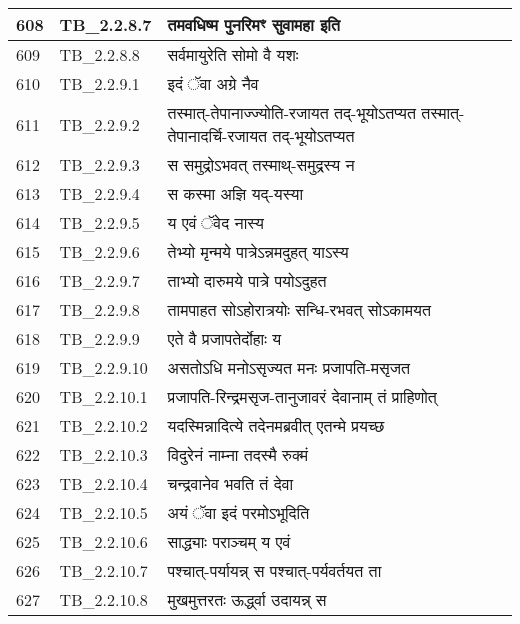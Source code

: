 \documentclass[17pt]{extarticle}
\begin{document}
\begin{longtable}{||p{0.4in}||p{0.9in}||p{4.0in}||p{0.9in}||}
        \hline
            608 & TB\_2.2.8.7 & तमवधिष्म पुनरिमꣳ सुवामहा इति &      \\
        \hline
            609 & TB\_2.2.8.8 & सर्वमायुरेति सोमो वै यशः &      \\
        \hline
            610 & TB\_2.2.9.1 & इदं ॅवा अग्रे नैव &      \\
        \hline
            611 & TB\_2.2.9.2 & तस्मात्{-}तेपानाज्ज्योति{-}रजायत तद्{-}भूयोऽतप्यत तस्मात्{-}तेपानादर्चि{-}रजायत तद्{-}भूयोऽतप्यत &      \\
        \hline
            612 & TB\_2.2.9.3 & स समुद्रोऽभवत् तस्माथ्{-}समुद्रस्य न &      \\
        \hline
            613 & TB\_2.2.9.4 & स कस्मा अज्ञि यद्{-}यस्या &      \\
        \hline
            614 & TB\_2.2.9.5 & य एवं ॅवेद नास्य &      \\
        \hline
            615 & TB\_2.2.9.6 & तेभ्यो मृन्मये पात्रेऽन्नमदुहत् याऽस्य &      \\
        \hline
            616 & TB\_2.2.9.7 & ताभ्यो दारुमये पात्रे पयोऽदुहत &      \\
        \hline
            617 & TB\_2.2.9.8 & तामपाहत सोऽहोरात्रयोः सन्धि{-}रभवत् सोऽकामयत &      \\
        \hline
            618 & TB\_2.2.9.9 & एते वै प्रजापतेर्दोहाः य &      \\
        \hline
            619 & TB\_2.2.9.10 & असतोऽधि मनोऽसृज्यत मनः प्रजापति{-}मसृजत &      \\
        \hline
            620 & TB\_2.2.10.1 & प्रजापति{-}रिन्द्रमसृज{-}तानुजावरं देवानाम् तं प्राहिणोत् &      \\
        \hline
            621 & TB\_2.2.10.2 & यदस्मिन्नादित्ये तदेनमब्रवीत् एतन्मे प्रयच्छ &      \\
        \hline
            622 & TB\_2.2.10.3 & विदुरेनं नाम्ना तदस्मै रुक्मं &      \\
        \hline
            623 & TB\_2.2.10.4 & चन्द्रवानेव भवति तं देवा &      \\
        \hline
            624 & TB\_2.2.10.5 & अयं ॅवा इदं परमोऽभूदिति &      \\
        \hline
            625 & TB\_2.2.10.6 & साद्ध्याः पराञ्चम् य एवं &      \\
        \hline
            626 & TB\_2.2.10.7 & पश्चात्{-}पर्यायन्न् स पश्चात्{-}पर्यवर्तयत ता &      \\
        \hline
            627 & TB\_2.2.10.8 & मुखमुत्तरतः ऊर्द्ध्वा उदायन्न् स &      \\

\end{longtable}
\end{document}
